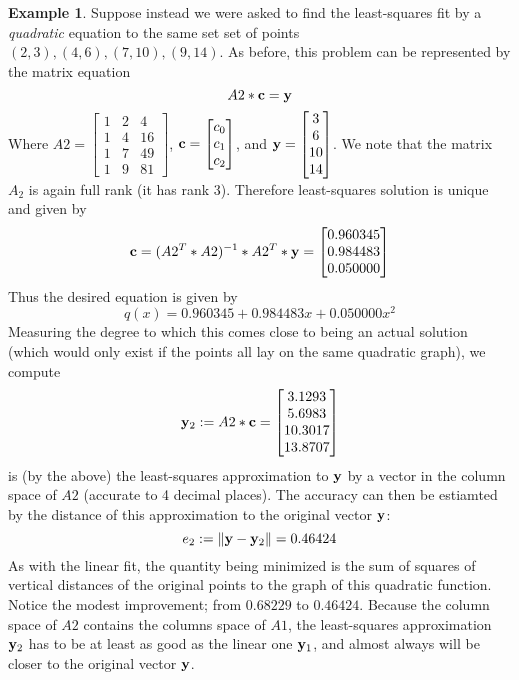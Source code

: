 \documentclass[11pt,notitlepage]{article}
\numberwithin{equation}{section}
\theoremstyle{plain}
\theoremstyle{definition}
\newtheorem{example}[equation]{Example}
\begin{document}
\begin{example} Suppose instead we were asked to find the least-squares fit by a {\it quadratic} equation to the same set set of points $(2,3), (4,6), (7,10), (9,14)$. As before, this problem can be represented by the matrix equation
\[
A2*{\bf c} = {\bf y}
\]
Where $A2 = \begin{bmatrix} 1 & 2 & 4\\1 & 4 & 16\\1 & 7 & 49\\1 & 9 & 81\end{bmatrix}$, ${\bf c} = \begin{bmatrix}c_0\\c_1\\c_2\end{bmatrix}$, and ${\bf y} = \begin{bmatrix} 3\\6\\10\\14\end{bmatrix}$. We note that the matrix $A_2$ is again full rank (it has rank 3). Therefore least-squares solution is unique and given by
\[
{\bf c} = (A2^T*A2)^{-1}*A2^T*{\bf y} = \begin{bmatrix} 0.960345\\ 0.984483\\0.050000\end{bmatrix}
\]
Thus the desired equation is given by
\[
q(x) = 0.960345 + 0.984483 x + 0.050000 x^2
\]
Measuring the degree to which this comes close to being an actual solution (which would only exist if the points all lay on the same quadratic graph), we compute
\[
{\bf y}_2 := A2*{\bf c} = \begin{bmatrix} 3.1293\\ 5.6983\\ 10.3017\\ 13.8707\end{bmatrix}
\]
is (by the above) the least-squares approximation to $\bf y$ by a vector in the column space of $A2$ (accurate to 4 decimal places). The accuracy can then be estiamted by the distance of this approximation to the original vector $\bf y$:
\[
e_2 := \|{\bf y} - {\bf y}_2\| = 0.46424
\]
As with the linear fit, the quantity being minimized is the sum of squares of vertical distances of the original points to the graph of this quadratic function. Notice the modest improvement; from $0.68229$ to $0.46424$. Because the column space of $A2$ contains the columns space of $A1$, the least-squares approximation ${\bf y}_2$ has to be at least as good as the linear one ${\bf y}_1$, and almost always will be closer to the original vector $\bf y$.
\end{example}
\end{document}

